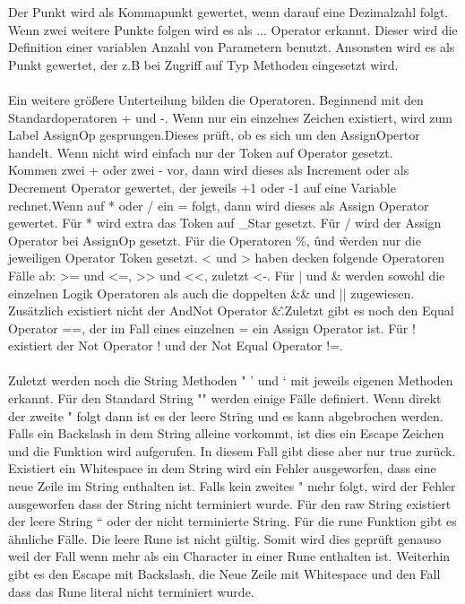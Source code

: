Der Punkt wird als Kommapunkt gewertet, wenn darauf eine Dezimalzahl folgt. Wenn zwei weitere Punkte folgen wird es als ... Operator erkannt. Dieser wird die Definition einer variablen Anzahl von Parametern benutzt. Ansonsten wird es als Punkt gewertet, der z.B bei Zugriff auf Typ Methoden eingesetzt wird.\\
\\ Ein weitere größere Unterteilung bilden die Operatoren. Beginnend mit den Standardoperatoren + und -.
Wenn nur ein einzelnes Zeichen existiert, wird zum Label AssignOp gesprungen.Dieses prüft, ob es sich um den AssignOpertor handelt. Wenn nicht wird einfach nur der Token auf Operator gesetzt.\\
Kommen zwei + oder zwei - vor, dann wird dieses als Increment oder als Decrement Operator gewertet, der jeweils +1 oder -1 auf eine Variable rechnet.Wenn auf * oder / ein = folgt, dann wird dieses als Assign Operator gewertet. Für * wird extra das Token auf \_Star gesetzt. Für / wird der Assign Operator bei AssignOp gesetzt.
Für die Operatoren \%, \^ und \~ werden nur die jeweiligen Operator Token gesetzt. < und > haben decken folgende Operatoren Fälle ab: >= und <=, >> und <<, zuletzt <-. Für | und \& werden sowohl die einzelnen Logik Operatoren als auch die doppelten \&\& und || zugewiesen. Zusätzlich existiert nicht der AndNot Operator \&\^.Zuletzt gibt es noch den Equal Operator ==, der im Fall eines einzelnen = ein Assign Operator ist. Für ! existiert der Not Operator ! und der Not Equal Operator !=. \\
\\ Zuletzt werden noch die String Methoden " ' und ` mit jeweils eigenen Methoden erkannt.
Für den Standard String "" werden einige Fälle definiert. Wenn direkt der zweite " folgt dann ist es der leere String und es kann abgebrochen werden. Falls ein Backslash in dem String alleine vorkommt, ist dies ein Escape Zeichen und die Funktion wird aufgerufen. In diesem Fall gibt diese aber nur true zurück. 
Existiert ein Whitespace in dem String wird ein Fehler ausgeworfen, dass eine neue Zeile im String enthalten ist. Falls kein zweites " mehr folgt, wird der Fehler ausgeworfen dass der String nicht terminiert wurde. Für den raw String existiert der leere String `` oder der nicht terminierte String.
Für die rune Funktion gibt es ähnliche Fälle. Die leere Rune ist nicht gültig. Somit wird dies geprüft genauso weil der Fall wenn mehr als ein Character in einer Rune enthalten ist. Weiterhin gibt es den Escape mit Backslash, die Neue Zeile mit Whitespace und den Fall dass das Rune literal nicht terminiert wurde.

